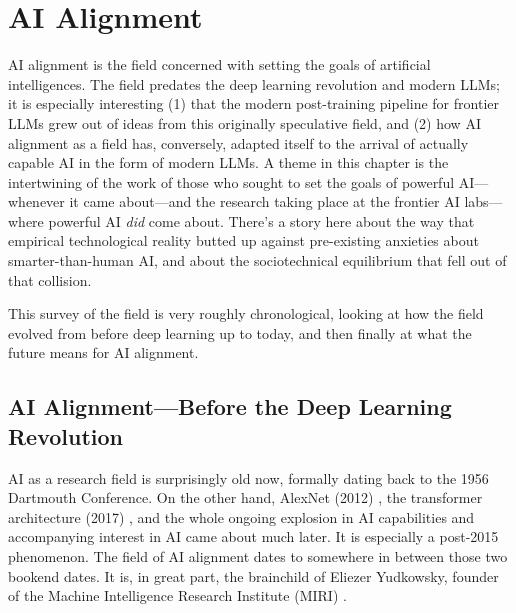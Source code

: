 \chapter{AI Alignment}\label{ch_ai_alignment}

AI alignment is the field concerned with setting the goals of artificial
intelligences. The field predates the deep learning revolution and modern LLMs;
it is especially interesting (1) that the modern post-training pipeline for
frontier LLMs grew out of ideas from this originally speculative field, and (2)
how AI alignment as a field has, conversely, adapted itself to the arrival of
actually capable AI in the form of modern LLMs. A theme in this chapter is the
intertwining of the work of those who sought to set the goals of powerful
AI---whenever it came about---and the research taking place at the frontier AI
labs---where powerful AI \emph{did} come about. There's a story here about the
way that empirical technological reality butted up against pre-existing
anxieties about smarter-than-human AI, and about the sociotechnical equilibrium
that fell out of that collision.

This survey of the field is very roughly chronological, looking at how the
field evolved from before deep learning up to today, and then finally at what
the future means for AI alignment.

\section{AI Alignment---Before the Deep Learning Revolution}
AI as a research field is surprisingly old now, formally dating back to the
1956 Dartmouth Conference. On the other hand, AlexNet (2012)
\cite{krizhevsky2012imagenet}, the transformer architecture (2017)
\cite{vaswani2017attention}, and the whole ongoing explosion in AI capabilities
and accompanying interest in AI came about much later. It is especially a
post-2015 phenomenon. The field of AI alignment dates to somewhere in between
those two bookend dates. It is, in great part, the brainchild of Eliezer
Yudkowsky, founder of the Machine Intelligence Research Institute (MIRI)
\cite{yudkowsky2008factor}.

